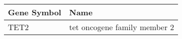 \begin{tabular}{ll}
\toprule
Gene Symbol &                         Name \\
\midrule
       TET2 & tet oncogene family member 2 \\
\bottomrule
\end{tabular}
